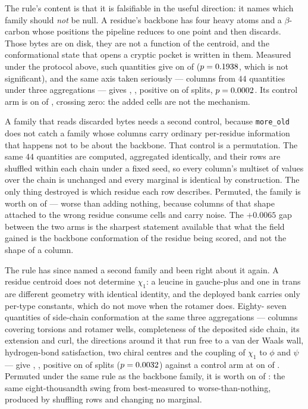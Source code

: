 \documentclass[11pt]{article}
\begin{document}
The rule's content is that it is falsifiable in the useful direction: it names
which family should \emph{not} be null. A residue's backbone has four heavy
atoms and a \(\beta\)-carbon whose positions the pipeline reduces to one point
and then discards. Those bytes are on disk, they are not a function of the
centroid, and the conformational state that opens a cryptic pocket is written in
them. Measured under the protocol above, \FamBkbNarrowCols{} such quantities
give \FamBkbNarrow{} on \FamBkbNarrowSplits{} of \FamBkbNarrowOf{}
(\(p=0.1938{}\), which is not significant), and the same axis taken
seriously --- \FamBkbCols{} columns from \(44\) quantities under three
aggregations --- gives \FamBkb{}, \FamBkbCI{}, positive on \FamBkbSplits{} of
\FamBkbOf{} splits, \(p=0.0002{}\). Its control arm is \FamBkbControl{} on
\FamBkbControlSplits{} of \FamBkbOf{}, crossing zero: the added cells are not
the mechanism.

A family that reads discarded bytes needs a second control, because
\texttt{more\_old} does not catch a family whose columns carry ordinary
per-residue information that happens not to be about the backbone. That control
is a permutation. The same \(44\) quantities are computed, aggregated
identically, and their rows are shuffled within each chain under a fixed seed,
so every column's multiset of values over the chain is unchanged and every
marginal is identical by construction. The only thing destroyed is which residue
each row describes. Permuted, the family is worth \FamBkbPerm{} on
\FamBkbPermSplits{} of \FamBkbPermOf{} --- worse than adding nothing, because
columns of that shape attached to the wrong residue consume cells and carry
noise. The \(+0.0065\) gap between the two arms is the sharpest statement
available that what the field gained is the backbone conformation of the residue
being scored, and not the shape of a column.

The rule has since named a second family and been right about it again. A
residue centroid does not determine \(\chi_1\): a leucine in gauche-plus and one
in trans are different geometry with identical identity, and the deployed bank
carries only per-type constants, which do not move when the rotamer does. Eighty-
seven quantities of side-chain conformation at the same three aggregations ---
\FamSideCols{} columns covering torsions and rotamer wells, completeness of the
deposited side chain, its extension and curl, the directions around it that run
free to a van der Waals wall, hydrogen-bond satisfaction, two chiral centres and
the coupling of \(\chi_1\) to \(\phi\) and \(\psi\) --- give \FamSide{},
\FamSideCI{}, positive on \FamSideSplits{} of \FamSideOf{} splits
(\(p=0.0032{}\)) against a control arm at \FamSideControl{} on
\FamSideControlSplits{} of \FamSideOf{}. Permuted under the same rule as the
backbone family, it is worth \FamSidePerm{} on \FamSidePermSplits{} of
\FamSidePermOf{}: the same eight-thousandth swing from best-measured to
worse-than-nothing, produced by shuffling rows and changing no marginal.
\end{document}
